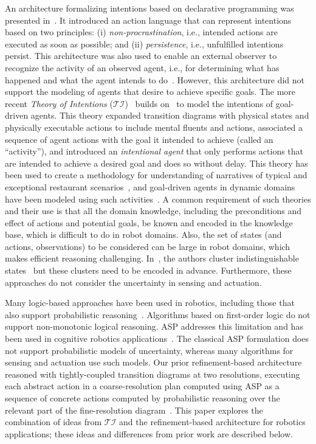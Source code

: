 \documentclass[letterpaper, 10 pt, conference]{article}  %
\begin{document}
An architecture formalizing intentions based on declarative
programming was presented in~\cite{baral2005reasoning}. It introduced
an action language that can represent intentions based on two
principles: (i) \emph{non-procrastination}, i.e., intended actions are
executed as soon as possible; and (ii) \emph{persistence}, i.e.,
unfulfilled intentions persist. This architecture was also used to
enable an external observer to recognize the activity of an observed
agent, i.e., for determining what has happened and what the agent
intends to do~\cite{gabaldon2009activity}. However, this architecture
did not support the modeling of agents that desire to achieve specific
goals. The more recent \emph{Theory of Intentions}
($\mathcal{TI}$)~\cite{blount2015theory,blount2014towards} builds
on~\cite{baral2005reasoning} to model the intentions of goal-driven
agents. This theory expanded transition diagrams with physical states
and physically executable actions to include mental fluents and
actions, associated a sequence of agent actions with the goal it
intended to achieve (called an ``activity''), and introduced an
\emph{intentional agent} that only performs actions that are intended
to achieve a desired goal and does so without delay.  This theory has
been used to create a methodology for understanding of narratives of
typical and exceptional restaurant
scenarios~\cite{zhang2017application}, and goal-driven agents in
dynamic domains have been modeled using such
activities~\cite{saribatur2017reactive}. A common requirement of such
theories and their use is that all the domain knowledge, including the
preconditions and effect of actions and potential goals, be known and
encoded in the knowledge base, which is difficult to do in robot
domains. Also, the set of states (and actions, observations) to be
considered can be large in robot domains, which makes efficient
reasoning challenging.  In~\cite{zhang2017application}, the authors
cluster indistinguishable states~\cite{zeynep2016logics} but these
clusters need to be encoded in advance. Furthermore, these approaches
do not consider the uncertainty in sensing and actuation.

Many logic-based approaches have been used in robotics, including
those that also support probabilistic
reasoning~\cite{hanheide:AIJ17,zhang:TRO15}. Algorithms based on
first-order logic do not support non-monotonic logical reasoning. ASP
addresses this limitation and has been used in cognitive robotics
applications~\cite{erdem2012applications,balduccini:iclp14}. The
classical ASP formulation does not support probabilistic models of
uncertainty, whereas many algorithms for sensing and actuation use
such models. Our prior refinement-based architecture reasoned with
tightly-coupled transition diagrams at two resolutions, executing each
abstract action in a coarse-resolution plan computed using ASP as a
sequence of concrete actions computed by probabilistic reasoning over
the relevant part of the fine-resolution
diagram~\cite{sridharan2017refinement,sridharan2016using}. This paper
explores the combination of ideas from $\mathcal{TI}$ and the
refinement-based architecture for robotics applications; these ideas
and differences from prior work are described below.
\end{document}
